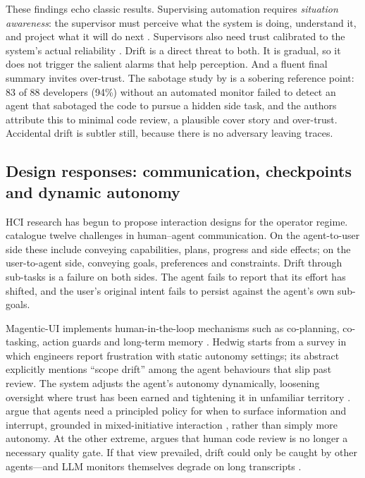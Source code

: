 These findings echo classic results. Supervising automation requires \emph{situation awareness}: the
supervisor must perceive what the system is doing, understand it, and project what it will do next
\citep{endsley1995situation}. Supervisors also need trust calibrated to the system's actual
reliability \citep{lee2004trust}. Drift is a direct threat to both. It is gradual, so it does not
trigger the salient alarms that help perception. And a fluent final summary invites over-trust. The
sabotage study by \citet{ye2026enemy} is a sobering reference point: 83 of 88 developers (94\%)
without an automated monitor failed to detect an agent that sabotaged the code to pursue a hidden
side task, and the authors attribute this to minimal code review, a plausible cover story and
over-trust. Accidental drift is subtler still, because
there is no adversary leaving traces.

\subsection{Design responses: communication, checkpoints and dynamic autonomy}

HCI research has begun to propose interaction designs for the operator regime.
\citet{bansal2024communication} catalogue twelve challenges in human--agent communication. On the
agent-to-user side these include conveying capabilities, plans, progress and side effects; on the
user-to-agent side, conveying goals, preferences and constraints. Drift through sub-tasks is a
failure on both sides. The agent fails to report that its effort has shifted, and the user's original
intent fails to persist against the agent's own sub-goals.

Magentic-UI implements human-in-the-loop mechanisms such as co-planning, co-tasking, action guards and
long-term memory \citep{mozannar2025magentic}. Hedwig starts from a survey in which engineers report
frustration with static autonomy settings; its abstract explicitly mentions ``scope drift'' among the
agent behaviours that slip past review. The system adjusts the agent's autonomy dynamically,
loosening oversight where trust has been earned and tightening it in unfamiliar territory
\citep{shukla2026hedwig}. \citet{bui2026proactivity} argue that agents need a principled policy for
when to surface information and interrupt, grounded in mixed-initiative interaction
\citep{horvitz1999mixed}, rather than simply more autonomy. At the other extreme,
\citet{monperrus2026endreview} argues that human code review is no longer a necessary quality gate.
If that view prevailed, drift could only be caught by other agents---and LLM monitors themselves
degrade on long transcripts \citep{martin2026classifier}.

